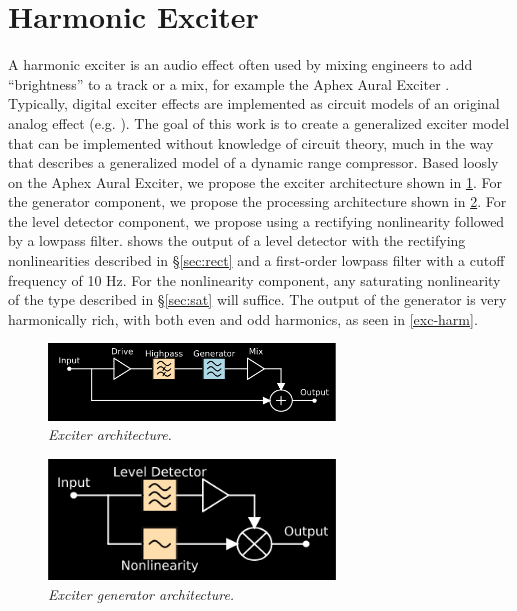 \documentclass[twoside,a4paper]{article}
\begin{document}
\section{Harmonic Exciter} \label{sec:exciter}
%
A harmonic exciter is an audio effect often used by mixing
engineers to add ``brightness'' to a track or a mix, for example
the Aphex Aural Exciter \cite{aphex}. Typically, digital exciter effects
are implemented as circuit models of an original analog effect (e.g.
\cite{exciter-model}). The goal of this work is to create a
generalized exciter model that can be implemented without knowledge of
circuit theory, much in the way that \cite{giannoulis2012digital} describes
a generalized model of a dynamic range compressor.
\newline\newline
Based loosly on the Aphex Aural Exciter, we propose the
exciter architecture shown in \cref{exc}. For the generator
component, we propose the processing architecture shown in
\cref{gen}.
\newline\newline
For the level detector component, we propose using a rectifying
nonlinearity followed by a lowpass filter.  shows the
output of a level detector with the rectifying nonlinearities described
in \S\ref{sec:rect} and a first-order lowpass filter with a cutoff
frequency of 10 Hz. For the nonlinearity component, any saturating
nonlinearity of the type described in \S\ref{sec:sat} will suffice. The
output of the generator is very harmonically rich, with both even and odd
harmonics, as seen in \cref{exc-harm}.
\newline\newline
%
\begin{figure}[h]
    \center
    \includegraphics[width=3in]{../Exciter/Pics/Exciter_FullArch.png}
    \caption{\label{exc}{\it Exciter architecture.}}
\end{figure}
%
\begin{figure}[h]
    \center
    \includegraphics[width=3in]{../Exciter/Pics/Exciter_Arch.png}
    \caption{\label{gen}{\it Exciter generator architecture.}}
\end{figure}
\end{document}

